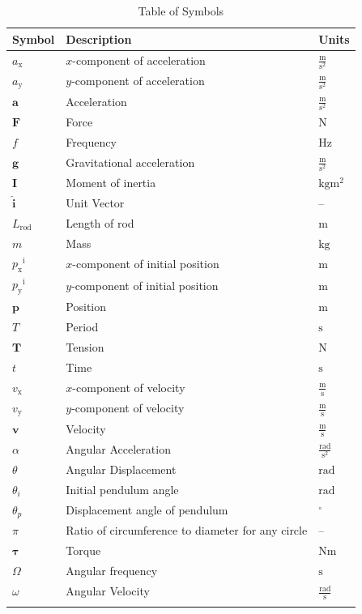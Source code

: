 \documentclass[12pt]{article}
\begin{document}
\begin{longtable}{l l l}
\toprule
\textbf{Symbol} & \textbf{Description} & \textbf{Units}
\\
\midrule
\endhead
${a_{\text{x}}}$ & $x$-component of acceleration & $\frac{\text{m}}{\text{s}^{2}}$
\\
${a_{\text{y}}}$ & $y$-component of acceleration & $\frac{\text{m}}{\text{s}^{2}}$
\\
$\mathbf{a}$ & Acceleration & $\frac{\text{m}}{\text{s}^{2}}$
\\
$\mathbf{F}$ & Force & ${\text{N}}$
\\
$f$ & Frequency & ${\text{Hz}}$
\\
$\mathbf{g}$ & Gravitational acceleration & $\frac{\text{m}}{\text{s}^{2}}$
\\
$\mathbf{I}$ & Moment of inertia & $\text{kg}\text{m}^{2}$
\\
$\mathbf{\hat{i}}$ & Unit Vector & --
\\
${L_{\text{rod}}}$ & Length of rod & ${\text{m}}$
\\
$m$ & Mass & ${\text{kg}}$
\\
${{p_{\text{x}}}^{\text{i}}}$ & $x$-component of initial position & ${\text{m}}$
\\
${{p_{\text{y}}}^{\text{i}}}$ & $y$-component of initial position & ${\text{m}}$
\\
$\mathbf{p}$ & Position & ${\text{m}}$
\\
$T$ & Period & ${\text{s}}$
\\
$\mathbf{T}$ & Tension & ${\text{N}}$
\\
$t$ & Time & ${\text{s}}$
\\
${v_{\text{x}}}$ & $x$-component of velocity & $\frac{\text{m}}{\text{s}}$
\\
${v_{\text{y}}}$ & $y$-component of velocity & $\frac{\text{m}}{\text{s}}$
\\
$\mathbf{v}$ & Velocity & $\frac{\text{m}}{\text{s}}$
\\
$α$ & Angular Acceleration & $\frac{\text{rad}}{\text{s}^{2}}$
\\
$θ$ & Angular Displacement & ${\text{rad}}$
\\
${θ_{i}}$ & Initial pendulum angle & ${\text{rad}}$
\\
${θ_{p}}$ & Displacement angle of pendulum & ${{}^{\circ}}$
\\
$π$ & Ratio of circumference to diameter for any circle & --
\\
$\mathbf{τ}$ & Torque & $\text{N}\text{m}$
\\
$Ω$ & Angular frequency & ${\text{s}}$
\\
$ω$ & Angular Velocity & $\frac{\text{rad}}{\text{s}}$
\\
\bottomrule
\caption{Table of Symbols}
\label{Table:ToS}
\end{longtable}
\end{document}
